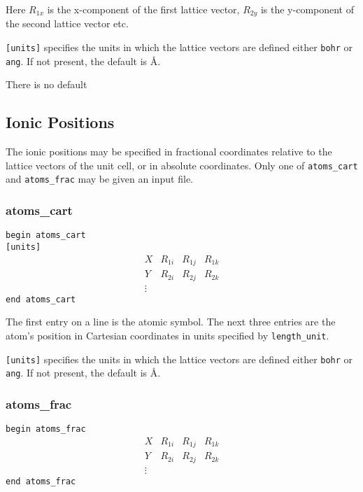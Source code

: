Here $R_{1x}$ is the x-component of the first lattice vector,
$R_{2y}$ is the y-component of the second lattice vector etc.

\verb#[units]# specifies the units in which the lattice vectors are
defined either \verb#bohr# or \verb#ang#. If not present, the default is \AA.


There is no default



\subsection[Ionic Positions]{Ionic Positions}

The ionic positions may be specified in fractional coordinates relative
to the lattice vectors of the unit cell, or in absolute coordinates.
Only one of \verb#atoms_cart# and \verb#atoms_frac# may be given an input
file.


\subsubsection{atoms\_cart}

\noindent \verb#begin atoms_cart# \\
\verb#[units]#
$$
\begin{array}{cccc}
X  & R_{1i} & R_{1j} & R_{1k} \\
Y  & R_{2i} & R_{2j} & R_{2k} \\
\vdots
\end{array}
$$
\verb#end atoms_cart#


The first entry on a line is the atomic symbol. The next three entries
are the atom's position in Cartesian coordinates in units specified by
\verb#length_unit#.

\verb#[units]# specifies the units in which the lattice vectors are
defined either \verb#bohr# or \verb#ang#. If not present, the default is \AA.

\subsubsection{atoms\_frac}

\noindent \verb#begin atoms_frac#
$$
\begin{array}{cccc}
X  & R_{1i} & R_{1j} & R_{1k} \\
Y  & R_{2i} & R_{2j} & R_{2k} \\
\vdots
\end{array}
$$
\verb#end atoms_frac#

